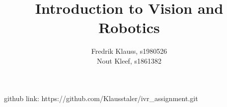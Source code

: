 \documentclass[11pt]{homeworg}
\title{Introduction to Vision and Robotics}
\author{
    Fredrik Klauss, s1980526\\
    Nout Kleef, s1861382
}
\begin{document}
\begin{samepage}
    github link: https://github.com/Klausstaler/ivr\_assignment.git





\end{samepage}
\end{document}
